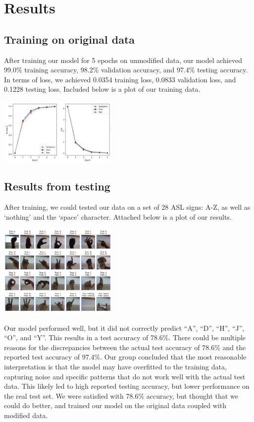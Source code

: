 \documentclass[10pt,twocolumn,letterpaper]{article}
\begin{document}
\section{Results}
\subsection{Training on original data}
After training our model for 5 epochs on unmodified data, our model achieved 99.0\% training accuracy,
98.2\% validation accuracy, and 97.4\% testing accuracy. In terms of loss, we achieved 0.0354 training
loss, 0.0833 validation loss, and 0.1228 testing loss. Included below is a plot of our training data.

\begin{center}
    \includegraphics[width=0.43\textwidth]{../writeup_imgs/model1Plot.png}
\end{center}

\subsection{Results from testing}
After training, we could tested our data on a set of 28 ASL signs: A-Z, as well as ‘nothing’
and the ‘space’ character. Attached below is a plot of our results.

\begin{center}
    \includegraphics[width=0.43\textwidth]{../writeup_imgs/test_output.png}
\end{center}

Our model performed well, but it did not correctly predict “A”, “D”, “H”, “J”, “O”, and “Y”.
This results in a test accuracy of 78.6\%. There could be multiple reasons for
the discrepancies between the actual test accuracy of 78.6\% and the reported test accuracy of 97.4\%.
Our group concluded that the most reasonable interpretation is that the model may have overfitted to the training data,
capturing noise and specific patterns that do not work well with the actual test data. This likely led to high reported
testing accuracy, but lower performance on the real test set. We were satisfied with 78.6\% accuracy,
but thought that we could do better, and trained our model on the original data coupled with modified data.
\end{document}
